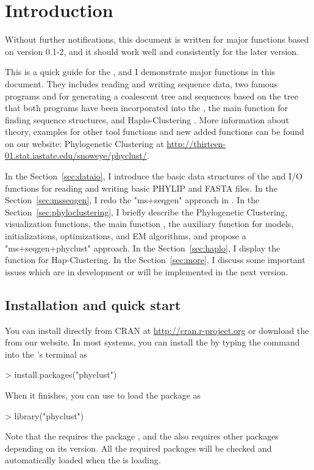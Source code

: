 
\section[Introduction]{Introduction}
\label{sec:introduction}

Without further notifications, this document is written for major
functions based on version 0.1-2,
and it should work well and consistently for the later version. 

This is a quick guide for the , and I demonstrate
major functions in this document. They
includes reading and writing sequence data,
two famous programs  and 
\citep{Hudson2002, Rambaut1997} for generating
a coalescent tree and sequences based on the tree
that both programs have been
incorporated into the ,
the main function  for finding sequence structures,
and Haplo-Clustering \citep{tzeng2005}.
More information about theory, examples for other tool functions
and new added functions can be found on our website:
Phylogenetic Clustering at
\url{http://thirteen-01.stat.iastate.edu/snoweye/phyclust/}.

In the Section~\ref{sec:dataio}, I introduce the basic data structures
of the  and I/O functions for reading and writing basic
PHYLIP and FASTA files. In the Section~\ref{sec:msseqgen},
I redo the "ms+seqgen" approach in .
In the Section~\ref{sec:phyloclustering}, I briefly describe the
Phylogenetic Clustering, visualization functions,
 the main function , the auxiliary function
 for models, initializations, optimizations,
and EM algorithms, and propose a "ms+seqgen+phyclust" approach.
In the Section~\ref{sec:haplo}, I display the function
 for Hap-Clustering.
In the Section~\ref{sec:more}, I discuss some important issues
which are in development or will be implemented in the next version.




\subsection[Installation and quick start]{Installation and quick start}
\label{sec:installation}

You can install directly from CRAN at \url{http://cran.r-project.org} or
download the  from our website.
In most systems, you can install the  by typing the command
into the 's terminal as
\begin{Code}
> install.packages("phyclust")
\end{Code}
When it finishes, you can use  to load the package as
\begin{Code}
> library("phyclust")
\end{Code}
Note that the  requires the
 package \citep{Paradis2004}, and
the  also requires other packages depending on its version.
All the required packages will be checked and automatically loaded when
the  is loading.

